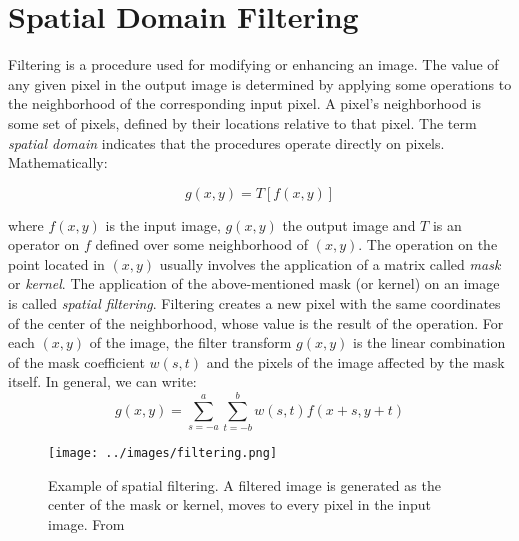 \documentclass{standalone}
\begin{document}
\section{Spatial Domain Filtering}


Filtering is a procedure used for modifying or enhancing an image.
The value of any given pixel in the output image is determined by applying some operations to the neighborhood of the corresponding input pixel.
A pixel's neighborhood is some set of pixels, defined by their locations relative to that pixel.
The term \textit{spatial domain} indicates that the procedures operate directly on pixels.
Mathematically:

\begin{equation}
    g(x,y) = T[f(x,y)] 
\end{equation}

where $f(x, y)$ is the input image, $g(x, y)$ the output image and $T$ is an operator on $f$ defined over some neighborhood of $(x, y)$.
The operation on the point located in $(x, y)$ usually involves the application of a matrix called \textit{mask} or \textit{kernel}.
The application of the above-mentioned mask (or kernel) on an image is called \textit{spatial filtering}.
Filtering creates a new pixel with the same coordinates of the center of the neighborhood, whose value is the result of the operation.
For each $(x, y)$ of the image, the filter transform $g(x, y)$ is the linear combination of the mask coefficient $w(s, t)$ and the pixels of the image affected by the mask itself.
In general, we can write:
\begin{equation}
    g(x, y) = \sum_{s = -a}^{a} \sum_{t = -b}^{b} w(s, t) f(x + s, y + t)
\end{equation}  

\begin{figure}[ht]

    \centering
    \texttt{[image: ../images/filtering.png]}
    
    \caption{Example of spatial filtering. A filtered image is generated as the center of the mask or kernel, moves to every pixel in the input image. From \cite{filtering}}
    \label{filtering}
\end{figure}
\end{document}
